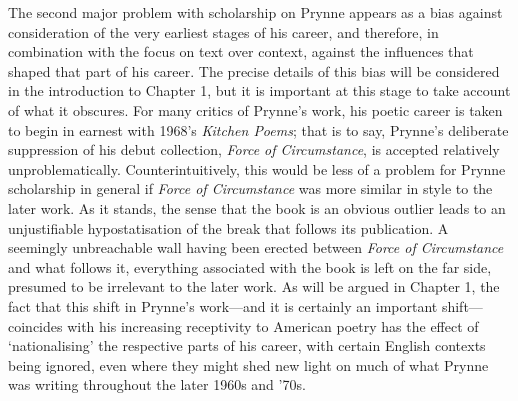 \documentclass[]{article}
\begin{document}
The second major problem with scholarship on Prynne appears as a bias
against consideration of the very earliest stages of his career, and
therefore, in combination with the focus on text over context, against
the influences that shaped that part of his career. The precise details
of this bias will be considered in the introduction to Chapter 1, but it
is important at this stage to take account of what it obscures. For many
critics of Prynne's work, his poetic career is taken to begin in earnest
with 1968's \emph{Kitchen Poems}; that is to say, Prynne's deliberate
suppression of his debut collection, \emph{Force of Circumstance}, is
accepted relatively unproblematically. Counterintuitively, this would be
less of a problem for Prynne scholarship in general if \emph{Force of
Circumstance} was more similar in style to the later work. As it stands,
the sense that the book is an obvious outlier leads to an unjustifiable
hypostatisation of the break that follows its publication. A seemingly
unbreachable wall having been erected between \emph{Force of
Circumstance} and what follows it, everything associated with the book
is left on the far side, presumed to be irrelevant to the later work. As
will be argued in Chapter 1, the fact that this shift in Prynne's
work---and it is certainly an important shift---coincides with his
increasing receptivity to American poetry has the effect of
`nationalising' the respective parts of his career, with certain English
contexts being ignored, even where they might shed new light on much of
what Prynne was writing throughout the later 1960s and '70s.
\end{document}
